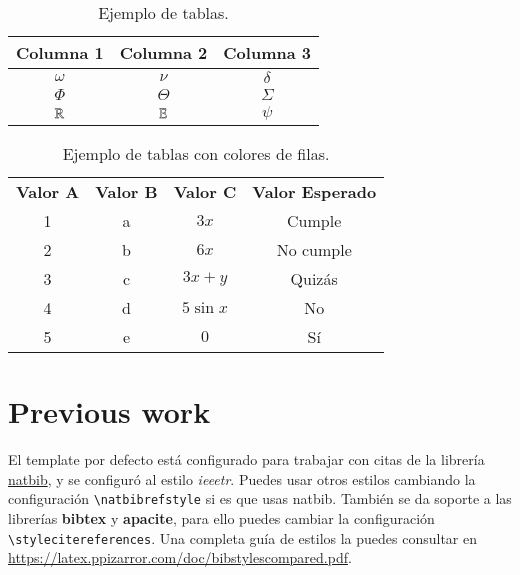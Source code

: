 \begin{table}[H] %
	\centering
	\caption{Ejemplo de tablas.}
	\begin{tabular}{ccc}
		\hline
		\textbf{Columna 1} & \textbf{Columna 2} & \textbf{Columna 3} \bigstrut\\
		\hline
		$\omega$ & $\nu$ & $\delta$ \bigstrut[t]\\
		$\Phi$ & $\Theta$ & $\varSigma$ \\
		$\mathbb{R}$ & $\mathbb{E}$ & $\psi$ \\
		\hline
	\end{tabular}
	\label{tab:tabla-1}
\end{table}

\enabletablerowcolor
\begin{table}[H]
	\centering
	\caption{Ejemplo de tablas con colores de filas.}
	\begin{tabular}{ccccc}
		\rowcolor[rgb]{ .749,  .749,  .749} \textbf{Valor A} & \textbf{Valor B} & \textbf{Valor C} & \multicolumn{2}{c}{\textbf{Valor Esperado}} \\
		1     & a     & $3x$  & \multicolumn{2}{c}{Cumple} \\
		2     & b     & $6x$  & \multicolumn{2}{c}{No cumple} \\
		3     & c     & $3x+y$ & \multicolumn{2}{c}{Quizás} \\
		4     & d     & $5\sin x$ & \multicolumn{2}{c}{No} \\
		5     & e     & $0$ & \multicolumn{2}{c}{Sí} \\
	\end{tabular}
\end{table}
\disabletablerowcolor
	
\section{Previous work}

El template por defecto está configurado para trabajar con citas de la librería \href{https://www.ctan.org/pkg/natbib}{natbib}, y se configuró al estilo \textit{ieeetr}. Puedes usar otros estilos cambiando la configuración \texttt{\textbackslash natbibrefstyle} si es que usas natbib. También se da soporte a las librerías \textbf{bibtex} y \textbf{apacite}, para ello puedes cambiar la configuración \texttt{\textbackslash stylecitereferences}. Una completa guía de estilos la puedes consultar en \url{https://latex.ppizarror.com/doc/bibstylescompared.pdf}. \\

